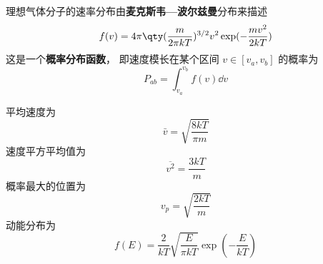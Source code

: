 
理想气体分子的速率分布由\textbf{麦克斯韦—波尔兹曼}分布来描述
\begin{equation}
f(v) = 4\pi \qty(\frac{m}{2\pi kT})^{3/2} v^2 \exp(-\frac{mv^2}{2kT})
\end{equation}
这是一个\textbf{概率分布函数}， 即速度模长在某个区间 $v \in [v_a, v_b]$ 的概率为
\begin{equation}
P_{ab} = \int_{v_a}^{v_b} f(v) \dd{v}
\end{equation}

平均速度为
\begin{equation}
\bar v = \sqrt{\frac{8kT}{\pi m}}
\end{equation}
速度平方平均值为
\begin{equation}
\overline {v^2} = \frac{3kT}{m}
\end{equation}
概率最大的位置为
\begin{equation}
v_p = \sqrt{\frac{2kT}{m}}
\end{equation}
动能分布为
\begin{equation}
f(E) = \frac{2}{kT}\sqrt{\frac{E}{\pi kT}} \exp(-\frac{E}{kT})
\end{equation}
